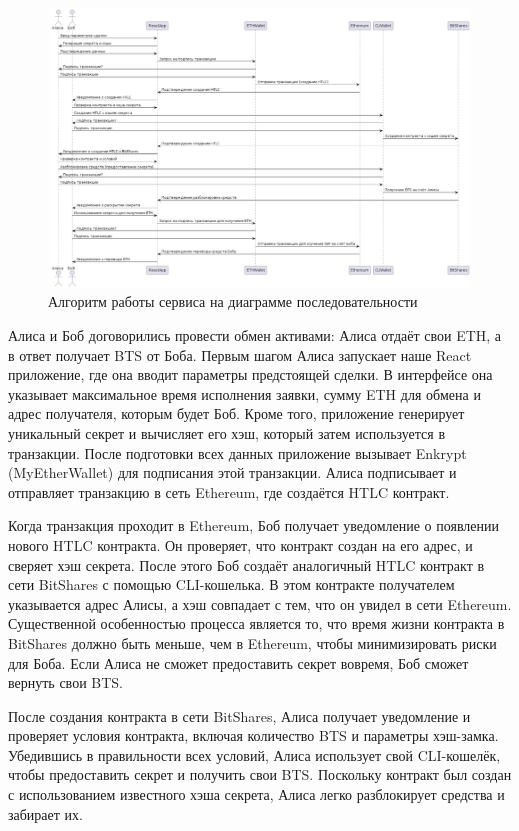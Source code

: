 \begin{figure}[H]
\centering
\includegraphics[scale=0.5]{res/sequence}
\caption{Алгоритм работы сервиса на диаграмме последовательности}
\label{pic:sequence}
\end{figure}

Алиса и Боб договорились провести обмен активами: Алиса отдаёт свои ETH, а в ответ получает BTS от Боба. Первым шагом Алиса запускает наше React приложение, где она вводит параметры предстоящей сделки. В интерфейсе она указывает максимальное время исполнения заявки, сумму ETH для обмена и адрес получателя, которым будет Боб. Кроме того, приложение генерирует уникальный секрет и вычисляет его хэш, который затем используется в транзакции. После подготовки всех данных приложение вызывает Enkrypt (MyEtherWallet) для подписания этой транзакции. Алиса подписывает и отправляет транзакцию в сеть Ethereum, где создаётся HTLC контракт.

Когда транзакция проходит в Ethereum, Боб получает уведомление о появлении нового HTLC контракта. Он проверяет, что контракт создан на его адрес, и сверяет хэш секрета. После этого Боб создаёт аналогичный HTLC контракт в сети BitShares с помощью CLI-кошелька. В этом контракте получателем указывается адрес Алисы, а хэш совпадает с тем, что он увидел в сети Ethereum. Существенной особенностью процесса является то, что время жизни контракта в BitShares должно быть меньше, чем в Ethereum, чтобы минимизировать риски для Боба. Если Алиса не сможет предоставить секрет вовремя, Боб сможет вернуть свои BTS.

После создания контракта в сети BitShares, Алиса получает уведомление и проверяет условия контракта, включая количество BTS и параметры хэш-замка. Убедившись в правильности всех условий, Алиса использует свой CLI-кошелёк, чтобы предоставить секрет и получить свои BTS. Поскольку контракт был создан с использованием известного хэша секрета, Алиса легко разблокирует средства и забирает их.

